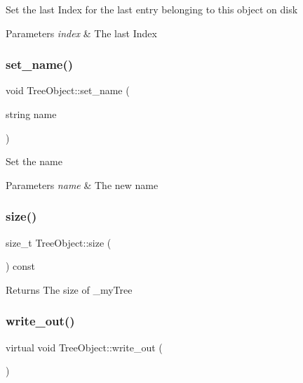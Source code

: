 Set the last Index for the last entry belonging to this object on disk 
\begin{DoxyParams}{Parameters}
{\em index} & The last Index \\
\hline
\end{DoxyParams}
\mbox{\label{classTreeObject_a8ae7e42502b4652102e0b3c4c4e1671b}} 
\subsubsection{\texorpdfstring{set\+\_\+name()}{set\_name()}}
{\footnotesize\ttfamily void Tree\+Object\+::set\+\_\+name (\begin{DoxyParamCaption}\item[{string}]{name }\end{DoxyParamCaption})}

Set the name 
\begin{DoxyParams}{Parameters}
{\em name} & The new name \\
\hline
\end{DoxyParams}
\mbox{\label{classTreeObject_a2a3dffe29aba8965c7977312c3721b50}} 
\subsubsection{\texorpdfstring{size()}{size()}}
{\footnotesize\ttfamily size\+\_\+t Tree\+Object\+::size (\begin{DoxyParamCaption}{ }\end{DoxyParamCaption}) const}

\begin{DoxyReturn}{Returns}
The size of \+\_\+my\+Tree 
\end{DoxyReturn}
\mbox{\label{classTreeObject_a63708d61353d83e3e03597394bb7aca0}} 
\subsubsection{\texorpdfstring{write\+\_\+out()}{write\_out()}}
{\footnotesize\ttfamily virtual void Tree\+Object\+::write\+\_\+out (\begin{DoxyParamCaption}{ }\end{DoxyParamCaption})\hspace{0.3cm}{\ttfamily [pure virtual]}}

